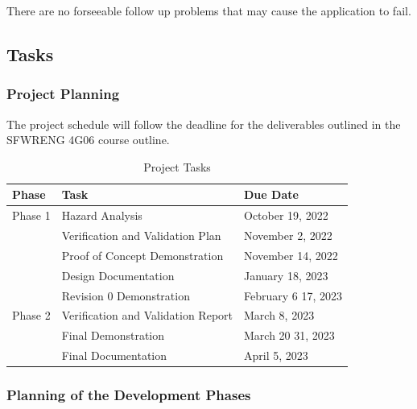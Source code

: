 \documentclass[12pt]{article}
\begin{document}
There are no forseeable follow up problems that may cause the application to fail.

\subsection{Tasks}
\subsubsection{Project Planning}
The project schedule will follow the deadline for the deliverables outlined in the SFWRENG 4G06
course outline.

\begin{table}[H]
	\centering
	\caption{Project Tasks}
	\vspace{5pt}
	\begin{tabular}{|p{}|p{}|p{}|}
		\hline
		\textbf{Phase} & \textbf{Task}                      & \textbf{Due Date}                 \\
		\hline
		Phase 1        & Hazard Analysis                    & October 19, 2022                  \\
		\cline{2-3}    & Verification and Validation Plan   & November 2, 2022                  \\
		\cline{2-3}    & Proof of Concept Demonstration     & November 14, 2022                 \\
		\cline{2-3}    & Design Documentation               & January 18, 2023                  \\
		\cline{2-3}    & Revision 0 Demonstration           & February 6 \textemdash{} 17, 2023 \\
		\hline
		Phase 2        & Verification and Validation Report & March 8, 2023                     \\
		\cline{2-3}    & Final Demonstration                & March 20 \textemdash{} 31, 2023   \\
		\cline{2-3}    & Final Documentation                & April 5, 2023                     \\
		\hline
	\end{tabular}

	\label{project_tasks}
\end{table}

\subsubsection{Planning of the Development Phases}
\end{document}
